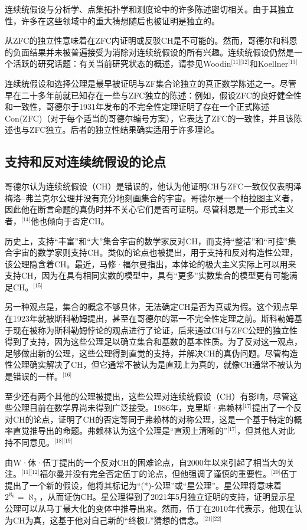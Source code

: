 连续统假设与分析学、点集拓扑学和测度论中的许多陈述密切相关。由于其独立性，许多在这些领域中的重大猜想随后也被证明是独立的。

从ZFC的独立性意味着在ZFC内证明或反驳CH是不可能的。然而，哥德尔和科恩的负面结果并未被普遍接受为消除对连续统假设的所有兴趣。连续统假设仍然是一个活跃的研究话题：有关当前研究状态的概述，请参见Woodin\(^\text{[11][12]}\)和Koellner\(^\text{[13]}\)

连续统假设和选择公理是最早被证明与ZF集合论独立的真正数学陈述之一。尽管早在二十多年前就已知存在一些与ZFC独立的陈述：例如，假设ZFC的良好健全性和一致性，哥德尔于1931年发布的不完全性定理证明了存在一个正式陈述Con(ZFC)（对于每个适当的哥德尔编号方案），它表达了ZFC的一致性，并且该陈述也与ZFC独立。后者的独立性结果确实适用于许多理论。
\subsection{支持和反对连续统假设的论点}  
哥德尔认为连续统假设（CH）是错误的，他认为他证明CH与ZFC一致仅仅表明泽梅洛–弗兰克尔公理并没有充分地刻画集合的宇宙。哥德尔是一个柏拉图主义者，因此他在断言命题的真伪时并不关心它们是否可证明。尽管科恩是一个形式主义者，\(^\text{[14]}\)他也倾向于否定CH。

历史上，支持“丰富”和“大”集合宇宙的数学家反对CH，而支持“整洁”和“可控”集合宇宙的数学家则支持CH。类似的论点也被提出，用于支持和反对构造性公理，该公理隐含着CH。最近，马修·福尔曼指出，本体论的极大主义实际上可以用来支持CH，因为在具有相同实数的模型中，具有“更多”实数集合的模型更有可能满足CH。\(^\text{[15]}\)

另一种观点是，集合的概念不够具体，无法确定CH是否为真或为假。这个观点早在1923年就被斯科勒姆提出，甚至在哥德尔的第一不完全性定理之前。斯科勒姆基于现在被称为斯科勒姆悖论的观点进行了论证，后来通过CH与ZFC公理的独立性得到了支持，因为这些公理足以确立集合和基数的基本性质。为了反对这一观点，足够做出新的公理，这些公理得到直觉的支持，并解决CH的真伪问题。尽管构造性公理确实解决了CH，但它通常不被认为是直观上为真的，就像CH通常不被认为是错误的一样。\(^\text{[16]}\)

至少还有两个其他的公理被提出，这些公理对连续统假设（CH）有影响，尽管这些公理目前在数学界尚未得到广泛接受。1986年，克里斯·弗赖林\(^\text{[17]}\)提出了一个反对CH的论点，证明了CH的否定等同于弗赖林的对称公理，这是一个基于特定的概率直觉推导出的命题。弗赖林认为这个公理是“直观上清晰的”\(^\text{[17]}\)，但其他人对此持不同意见。\(^\text{[18][19]}\)

由W·休·伍丁提出的一个反对CH的困难论点，自2000年以来引起了相当大的关注。\(^\text{[11][12]}\)福尔曼并没有完全否定伍丁的论点，但他强调了谨慎的重要性。\(^\text{[20]}\)伍丁提出了一个新的假设，他将其标记为“(*)-公理”或“星公理”。星公理将意味着\( 2^{\aleph_0} = \aleph_2 \)，从而证伪CH。星公理得到了2021年5月独立证明的支持，证明显示星公理可以从马丁最大化的变体中推导出来。然而，伍丁在2010年代表示，他现在认为CH为真，这基于他对自己新的“终极L”猜想的信念。\(^\text{[21][22]}\)